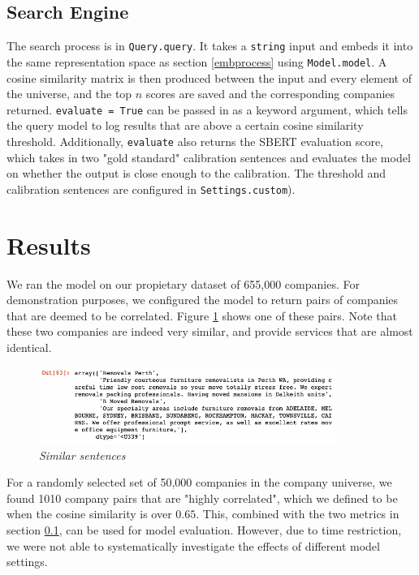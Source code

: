 \documentclass[a4paper]{article}
\begin{document}
\subsection{Search Engine}\label{search} The search process is in
\lstinline{Query.query}. It takes a \lstinline{string} input and embeds it into
the same representation space as section \ref{embprocess} using
\lstinline{Model.model}. A cosine similarity matrix is then produced between the
input and every element of the universe, and the top $n$ scores are saved and
the corresponding companies returned. \lstinline{evaluate = True} can be passed
in as a keyword argument, which tells the query model to log
results that are above a certain cosine similarity threshold. Additionally,
\lstinline{evaluate} also returns the SBERT evaluation score, which takes in two
"gold standard" calibration sentences and evaluates the model on whether the
output is close enough to the calibration. The threshold and calibration
sentences are configured in \lstinline{Settings.custom}).

\section{Results}\label{results}
We ran the model on our propietary dataset of 655,000 companies. For
demonstration purposes, we configured the model to return pairs of companies
that are deemed to be correlated. Figure \ref{output} shows one of these pairs.
Note that these two companies are indeed very similar, and provide services that
are almost identical. 

\begin{figure}[!h]
    \centerline{\includegraphics[width=97mm]{output.png}} \caption{{\it Similar sentences}}
    \label{output}
\end{figure}

For a randomly selected set of 50,000 companies in the company universe, we
found 1010 company pairs that are "highly correlated", which we defined to be when the
cosine similarity is over $0.65$. This, combined with the two metrics in section
\ref{search}, can be used for model evaluation. However, due to time
restriction, we were not able to systematically investigate the effects of
different model settings. 
\end{document}
